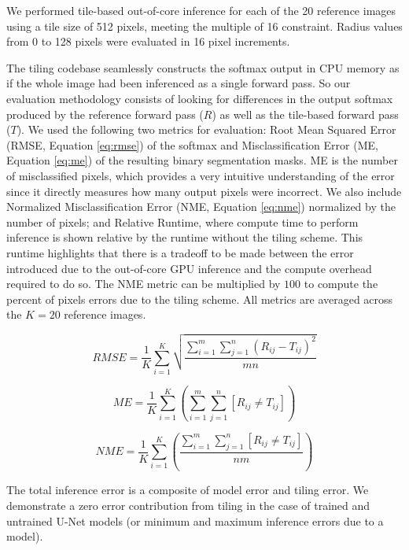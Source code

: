 \documentclass[runningheads]{llncs}
\begin{document}
We performed tile-based out-of-core inference for each of the 20 reference images using a tile size of 512 pixels, meeting the multiple of 16 constraint. Radius values from 0 to 128 pixels were evaluated in 16 pixel increments. 

The tiling codebase seamlessly constructs the softmax output in CPU memory as if the whole image had been inferenced as a single forward pass. So our evaluation methodology consists of looking for differences in the output softmax produced by the reference forward pass ($R$) as well as the tile-based forward pass ($T$). We used the following two metrics for evaluation: Root Mean Squared Error (RMSE, Equation \ref{eq:rmse}) of the softmax and Misclassification Error (ME, Equation \ref{eq:me}) of the resulting binary segmentation masks. ME is the number of misclassified pixels, which provides a very intuitive understanding of the error since it directly measures how many output pixels were incorrect. We also include Normalized Misclassification Error (NME, Equation \ref{eq:nme}) normalized by the number of pixels; and Relative Runtime, where compute time to perform inference is shown relative by the runtime without the tiling scheme. This runtime highlights that there is a tradeoff to be made between the error introduced due to the out-of-core GPU inference and the compute overhead required to do so. The NME metric can be multiplied by $100$ to compute the percent of pixels errors due to the tiling scheme.
All metrics are averaged across the $K = 20$ reference images.

\begin{equation}
RMSE = \frac{1}{K} \sum_{i=1}^{K} \sqrt{ \frac{\sum_{i = 1}^{m} \sum_{j = 1}^{n} (R_{ij} - T_{ij})^2}{mn}}
\label{eq:rmse}
\end{equation}

\begin{equation}
ME = \frac{1}{K} \sum_{i=1}^{K} \left( \sum_{i = 1}^{m} \sum_{j = 1}^{n} [ R_{ij} \neq T_{ij} ] \right) 
\label{eq:me}
\end{equation}

\begin{equation}
NME = \frac{1}{K} \sum_{i=1}^{K} \left( \frac{\sum_{i = 1}^{m} \sum_{j = 1}^{n} [ R_{ij} \neq T_{ij} ]}{nm} \right) 
\label{eq:nme}
\end{equation}

 The total inference error is a composite of model error and tiling error. We demonstrate a zero error contribution from tiling in the case of trained and untrained U-Net models (or minimum and maximum inference errors due to a model).
  
\end{document}

